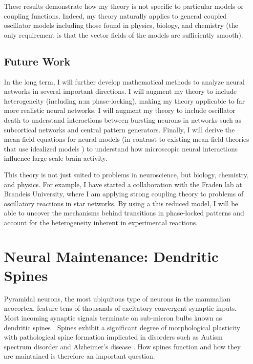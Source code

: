 \documentclass[a4paper,11pt]{article}
\begin{document}
These results demonstrate how my theory is not specific to particular models or coupling functions. Indeed, my theory naturally applies to general coupled oscillator models including those found in physics, biology, and chemistry (the only requirement is that the vector fields of the models are sufficiently smooth).

\subsection{Future Work}

In the long term, I will further develop mathematical methods to analyze neural networks in several important directions. I will augment my theory to include heterogeneity (including n:m phase-locking), making my theory applicable to far more realistic neural networks. I will augment my theory to include oscillator death to understand interactions between bursting neurons in networks such as subcortical networks and central pattern generators. Finally, I will derive the mean-field equations for neural models (in contrast to existing mean-field theories that use idealized models \cite{ott2008low}) to understand how microscopic neural interactions influence large-scale brain activity.

This theory is not just suited to problems in neuroscience, but biology, chemistry, and physics. For example, I have started a collaboration with the Fraden lab at Brandeis University, where I am applying strong coupling theory to problems of oscillatory reactions in star networks. By using a this reduced model, I will be able to uncover the mechanisms behind transitions in phase-locked patterns and account for the heterogeneity inherent in experimental reactions.

\section{Neural Maintenance: Dendritic Spines} \label{sec:maintenance}

Pyramidal neurons, the most ubiquitous type of neurons in the mammalian neocortex, feature tens of thousands of excitatory convergent synaptic inputs. Most incoming synaptic signals terminate on sub-micron bulbs known as dendritic spines \cite{nimchinsky2002structure}. Spines exhibit a significant degree of morphological plasticity \cite{kasai2010structural} with pathological spine formation implicated in disorders such as Autism spectrum disorder and Alzheimer's disease \cite{penzes2011dendritic}. How spines function and how they are maintained is therefore an important question.
\end{document}

